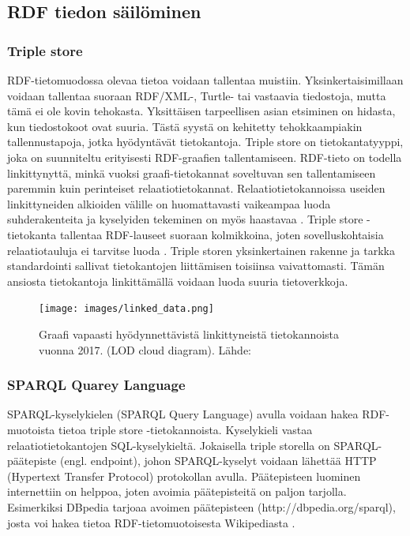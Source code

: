 \documentclass[finnish, 12pt, a4paper, elec, utf8, pdfa, online]{aaltothesis}
\begin{document}
{\subsection{RDF tiedon säilöminen}


\subsubsection{Triple store}
RDF-tietomuodossa olevaa tietoa voidaan tallentaa muistiin. Yksinkertaisimillaan voidaan tallentaa suoraan RDF/XML-, Turtle- tai vastaavia tiedostoja, mutta tämä ei ole kovin tehokasta. Yksittäisen tarpeellisen asian etsiminen on hidasta, kun tiedostokoot ovat suuria. Tästä syystä on kehitetty tehokkaampiakin tallennustapoja, jotka hyödyntävät tietokantoja. Triple store on tietokantatyyppi, joka on suunniteltu erityisesti RDF-graafien tallentamiseen. RDF-tieto on todella linkittynyttä, minkä vuoksi graafi-tietokannat soveltuvan sen tallentamiseen paremmin kuin perinteiset relaatiotietokannat. Relaatiotietokannoissa useiden linkittyneiden alkioiden välille on huomattavasti vaikeampaa luoda suhderakenteita ja kyselyiden tekeminen on myös haastavaa \cite{triplestore2}. Triple store -tietokanta tallentaa RDF-lauseet suoraan kolmikkoina, joten sovelluskohtaisia relaatiotauluja ei tarvitse luoda \cite{triplestore}. Triple storen yksinkertainen rakenne ja tarkka standardointi sallivat tietokantojen liittämisen toisiinsa vaivattomasti. Tämän ansiosta tietokantoja linkittämällä voidaan luoda suuria tietoverkkoja.


\begin{figure}[htb]
\centering
\texttt{[image: images/linked\_data.png]}
\caption{Graafi vapaasti hyödynnettävistä linkittyneistä tietokannoista vuonna 2017. (LOD cloud diagram). Lähde: \cite{LOD_cloud} \label{images/linked_data}}
\end{figure}
\clearpage

\subsubsection{SPARQL Quarey Language}
SPARQL-kyselykielen (SPARQL Query Language) avulla voidaan hakea RDF-muotoista tietoa triple store -tietokannoista. Kyselykieli vastaa relaatiotietokantojen SQL-kyselykieltä. Jokaisella triple storella on SPARQL-päätepiste (engl. endpoint), johon SPARQL-kyselyt voidaan lähettää HTTP (Hypertext Transfer Protocol) protokollan avulla. Päätepisteen luominen internettiin on helppoa, joten avoimia päätepisteitä on paljon tarjolla. Esimerkiksi DBpedia tarjoaa avoimen päätepisteen (http://dbpedia.org/sparql), josta voi hakea tietoa RDF-tietomuotoisesta Wikipediasta \cite{Antoniou}.

}
\end{document}
